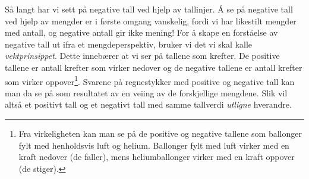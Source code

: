 Så langt har vi sett på negative tall ved hjelp av tallinjer. Å se på negative tall ved hjelp av mengder er i første omgang vanskelig, fordi vi har likestilt mengder med antall, og negative antall gir ikke mening! For å skape en forståelse av negative tall ut ifra et mengdeperspektiv, bruker vi det vi skal kalle \textit{vektprinsippet}. Dette innebærer at vi ser på tallene som krefter. De positive tallene er antall krefter som virker nedover og de negative tallene er antall krefter som virker oppover\footnote{Fra virkeligheten kan man se på de positive og negative tallene som ballonger fylt med henholdsvis luft og helium. Ballonger fylt med luft virker med en kraft nedover (de faller), mens heliumballonger virker med en kraft oppover (de stiger).}. Svarene på regnestykker med positive og negative tall kan man da se på som resultatet av en veiing av de forskjellige mengdene. Slik vil altså et positivt tall og et negativt tall med samme tallverdi \textsl{utligne} hverandre.
\vsk




